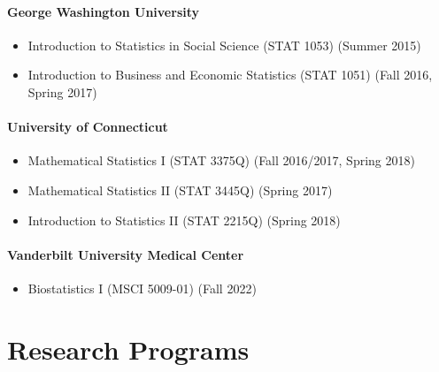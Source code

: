 \documentclass[12pt]{article}
\begin{document}
	\paragraph{George Washington University}
	\begin{itemize}
		\item Introduction to Statistics in Social Science (STAT 
		1053) (Summer 2015)
		\item Introduction to Business and Economic Statistics 
		(STAT 1051) (Fall 2016, Spring 2017)
	\end{itemize}
	\paragraph{University of Connecticut}
	\begin{itemize}
		\item Mathematical Statistics {\rm I} (STAT 3375Q) (Fall 
		2016/2017, Spring 2018)
		\item Mathematical Statistics {\rm II} (STAT 3445Q) (Spring 
		2017)
		\item Introduction to Statistics {\rm II} (STAT 2215Q) 
		(Spring 2018)
	\end{itemize}
	\paragraph{Vanderbilt University Medical Center}
	\begin{itemize}
		\item Biostatistics {\rm I} (MSCI 5009-01) (Fall 2022)
	\end{itemize}

	
	\section*{Research Programs}
\end{document}
